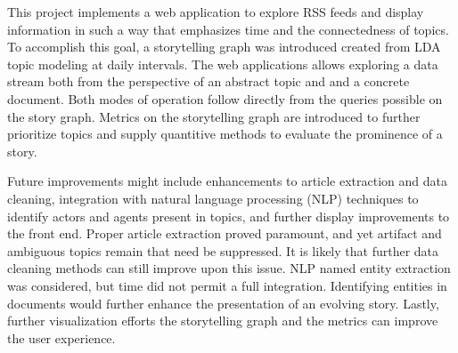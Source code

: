 \documentclass[10pt]{article}
\begin{document}
This project implements a web application to explore RSS feeds and display information in such a way that emphasizes time and the connectedness of topics.  To accomplish this goal, a storytelling graph was introduced created from LDA topic modeling at daily intervals.  The web applications allows exploring a data stream both from the perspective of an abstract topic and and a concrete document.  Both modes of operation follow directly from the queries possible on the story graph.  Metrics on the storytelling graph are introduced to further prioritize topics and supply quantitive methods to evaluate the prominence of a story.

Future improvements might include enhancements to article extraction and data cleaning, integration with natural language processing (NLP) techniques to identify actors and agents present in topics, and further display improvements to the front end.  Proper article extraction proved paramount, and yet artifact and ambiguous topics remain that need be suppressed.  It is likely that further data cleaning methods can still improve upon this issue.  NLP named entity extraction was considered, but time did not permit a full integration.  Identifying entities in documents would further enhance the presentation of an evolving story.  Lastly, further visualization efforts the storytelling graph and the metrics can improve the user experience.  
\end{document}
